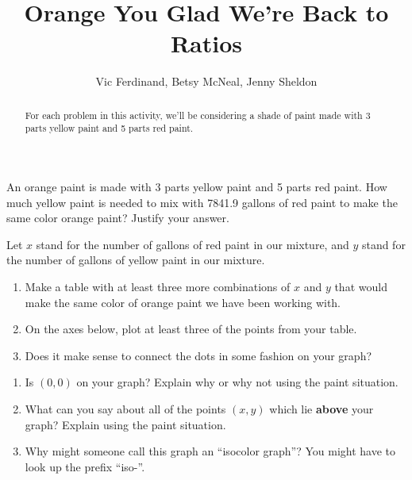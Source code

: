 \documentclass{ximera}
\title{Orange You Glad We're Back to Ratios}
\author{Vic Ferdinand, Betsy McNeal, Jenny Sheldon}
\begin{document}
\begin{abstract}
For each problem in this activity, we'll be considering a shade of paint made with 3 parts yellow paint and 5 parts red paint. 
\end{abstract}
\maketitle



\begin{problem} \label{Orange1}
 An orange paint is made with 3 parts yellow paint and 5 parts red paint.  How much yellow paint is needed to mix with 7841.9 gallons of red paint to make the same color orange paint?  Justify your answer.

\end{problem}
 
 
 

\begin{problem} \label{Orange2}
Let $x$ stand for the number of gallons of red paint in our mixture, and $y$ stand for the number of gallons of yellow paint in our mixture.
\begin{enumerate}
    \item Make a table with at least three more combinations of $x$ and $y$ that would make the same color of orange paint we have been working with.
    \item On the axes below, plot at least three of the points from your table.
    \item Does it make sense to connect the dots in some fashion on your graph?
\end{enumerate}


\begin{center}
\end{center}
\end{problem}





\begin{problem} \label{Orange3}
\begin{enumerate}
    \item Is $(0,0)$ on your graph?  Explain why or why not using the paint situation.
    \item What can you say about all of the points $(x,y)$ which lie {\bf above} your graph?  Explain using the paint situation.
    \item Why might someone call this graph an ``isocolor graph''?  You might have to look up the prefix ``iso-''.
\end{enumerate}
\end{problem}
\end{document}
